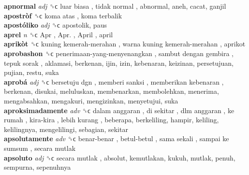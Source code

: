 \textbf{apnormal} \emph{adj}  ␝ϲ   luar biasa ,  tidak normal , abnormal, aneh, cacat, ganjil  \\
\textbf{apostròf} ␝ϲ   koma atas ,  koma terbalik   \\
\textbf{apostóliko} \emph{adj}  ␝ϲ  apostolik, paus  \\
\textbf{aprel} \emph{n}  ␝ϲ   Apr ,  Apr. ,  April , april  \\
\textbf{aprikòt} ␝ϲ   kuning kemerah-merahan ,  warna kuning kemerah-merahan , aprikot  \\
\textbf{aprobashon} ␝ϲ   penerimaan-yang-menyenangkan ,  sambut dengan gembira ,  tepuk sorak , aklamasi, berkenan, ijin, izin, kebenaran, keizinan, persetujuan, pujian, restu, suka  \\
\textbf{aprobá} \emph{adj}  ␝ϲ   bersetuju dgn ,  memberi sanksi ,  memberikan kebenaran , berkenan, disukai, meluluskan, membenarkan, membolehkan, menerima, mengabsahkan, mengakuri, mengizinkan, menyetujui, suka  \\
\textbf{aproksimadamente} \emph{adv}  ␝ϲ   dalam anggaran ,  di sekitar ,  dlm anggaran ,  ke rumah ,  kira-kira ,  lebih kurang , beberapa, berkeliling, hampir, keliling, kelilingnya, mengelilingi, sebagian, sekitar  \\
\textbf{apsolutamente} \emph{adv}  ␝ϲ   benar-benar ,  betul-betul ,  sama sekali ,  sampai ke sumsum ,  secara mutlak   \\
\textbf{apsoluto} \emph{adj}  ␝ϲ   secara mutlak , absolut, kemutlakan, kukuh, mutlak, penuh, sempurna, sepenuhnya  \\
